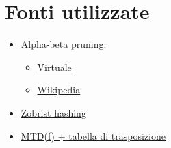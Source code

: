 \section{Fonti utilizzate}
\begin{itemize}
    \item Alpha-beta pruning:
    \begin{itemize}
        \item \href{https://virtuale.unibo.it/pluginfile.php/787909/mod_resource/content/7/03%20-%20Alberi%20-%20Minimax%20e%20AlphaBeta.pdf}{Virtuale}
        \item \href{https://en.wikipedia.org/wiki/Alpha-beta_pruning}{Wikipedia}
    \end{itemize}

    \item \href{https://en.wikipedia.org/wiki/Zobrist_hashing}{Zobrist hashing}
    \item \href{https://askeplaat.wordpress.com/534-2/mtdf-algorithm/}{MTD(f) + tabella di trasposizione}
\end{itemize}
